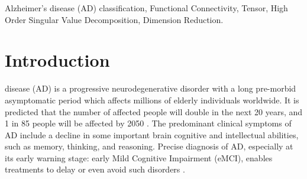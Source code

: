 \documentclass[journal]{IEEEtran}
\begin{document}
	
	
	\begin{IEEEkeywords}
		Alzheimer’s disease (AD) classification, Functional Connectivity, Tensor, High Order Singular Value Decomposition, Dimension Reduction.
	\end{IEEEkeywords}
	
	
	
	
	
	
	\IEEEpeerreviewmaketitle
	
	
	
	\section{Introduction}
	 disease (AD) is a progressive neurodegenerative disorder with a long pre-morbid asymptomatic period which affects millions of elderly individuals worldwide\cite{r01}. It is predicted that the number of affected people will double in the next 20 years, and 1 in 85 people will be affected by 2050 \cite{r02}. The predominant clinical symptoms of AD include a decline in some important brain cognitive and intellectual abilities, such as memory, thinking, and reasoning. Precise diagnosis of AD, especially at its early warning stage: early Mild Cognitive Impairment (eMCI), enables treatments to delay or even avoid such disorders \cite{r03}.  
	
\end{document}
